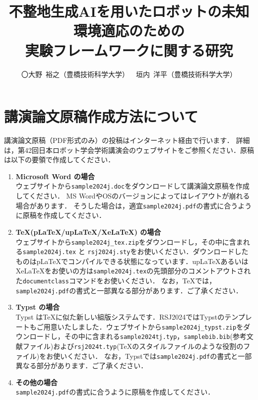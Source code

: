 \documentclass[twocolumn]{jarticle} %
\begin{document}
\title{不整地生成AIを用いたロボットの未知環境適応のための\\実験フレームワークに関する研究}
\author{〇大野\ 裕之（豊橋技術科学大学）\ \ 垣内\ 洋平（豊橋技術科学大学）}
\setlength{\baselineskip}{4.4mm}	%
\maketitle
\thispagestyle{empty}
\pagestyle{empty}

\section{講演論文原稿作成方法について}
講演論文原稿（PDF形式のみ）の投稿はインターネット経由で行います．
詳細は，第42回日本ロボット学会学術講演会のウェブサイト\cite{website}をご参照ください．原稿は以下の要領で作成してください．

\begin{enumerate}
    \item {\bfseries Microsoft Word の場合}\\
    ウェブサイト\cite{website}から\verb|sample2024j.doc|をダウンロードして講演論文原稿を作成してください．
    MS WordやOSのバージョンによってはレイアウトが崩れる場合があります．
    そうした場合は，適宜\verb|sample2024j.pdf|の書式に合うように原稿を作成してください．

  \item {\bfseries \TeX (pLaTeX/upLaTeX/XeLaTeX) の場合}\\
    ウェブサイト\cite{website}から\verb|sample2024j_tex.zip|をダウンロードし，その中に含まれる\verb|sample2024j.tex| と \verb|rsj2024j.sty|をお使いください．ダウンロードしたものはpLaTeXでコンパイルできる状態になっています．upLaTeXあるいはXeLaTeXをお使いの方は\verb|sample2024j.tex|の先頭部分のコメントアウトされた\verb|documentclass|コマンドをお使いください．
    なお，\TeX では，\verb|sample2024j.pdf|の書式と一部異なる部分があります．ご了承ください．
  \item {\bfseries Typst の場合}\\
    Typst\cite{typst} は\TeX{}に似た新しい組版システムです．RSJ2024ではTypstのテンプレートもご用意いたしました．ウェブサイト\cite{website}から\verb|sample2024j_typst.zip|をダウンロードし，その中に含まれる\verb|sample2024tj.typ|，\verb|samplebib.bib|(参考文献ファイル)および\verb|rsj2024t.typ|(\TeX{}のスタイルファイルのような役割のファイル)をお使いください．
    なお，Typstでは\verb|sample2024j.pdf|の書式と一部異なる部分があります．ご了承ください．
    \item {\bfseries その他の場合}\\        
    \verb|sample2024j.pdf|の書式に合うように原稿を作成してください．
\end{enumerate}
\end{document}

